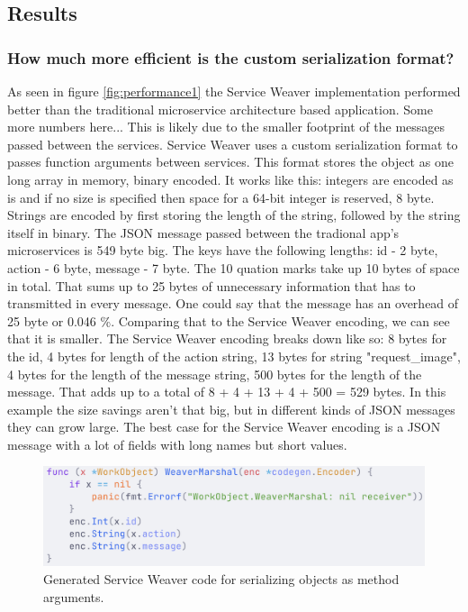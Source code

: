 \documentclass[sigconf,review,9pt]{acmart}
\begin{document}
\subsection{Results}

\subsubsection{How much more efficient is the custom serialization format?}

As seen in figure \ref{fig:performance1} the Service Weaver implementation performed
better than the traditional microservice architecture based application.
Some more numbers here...
This is likely due to the smaller footprint of the messages passed between the services.
Service Weaver uses a custom serialization format to passes function arguments between services.
This format stores the object as one long array in memory, binary encoded.
It works like this: integers are encoded as is and if no size is specified then
space for a 64-bit integer is reserved, 8 byte.
Strings are encoded by first storing the length of the string, followed by the string
itself in binary.
The JSON message passed between the tradional app's microservices is 549 byte big.
The keys have the following lengths: id - 2 byte, action - 6 byte, message - 7 byte.
The 10 quation marks take up 10 bytes of space in total.
That sums up to 25 bytes of unnecessary information that has to transmitted in every message.
One could say that the message has an overhead of 25 byte or 0.046 \%.
Comparing that to the Service Weaver encoding, we can see that it is smaller.
The Service Weaver encoding breaks down like so: 8 bytes for the id, 4 bytes for length
of the action string, 13 bytes for string "request\_image", 4 bytes for the length
of the message string, 500 bytes for the length of the message.
That adds up to a total of 8 + 4 + 13 + 4 + 500 = 529 bytes.
In this example the size savings aren't that big, but in different kinds of JSON messages
they can grow large.
The best case for the Service Weaver encoding is a JSON message with a lot of fields
with long names but short values.

\begin{figure}
	\includegraphics[width=\columnwidth]{serialization_code}
	\caption{Generated Service Weaver code for serializing objects
		as method arguments.}
	\label{fig:serialization_code}
\end{figure}
\end{document}
